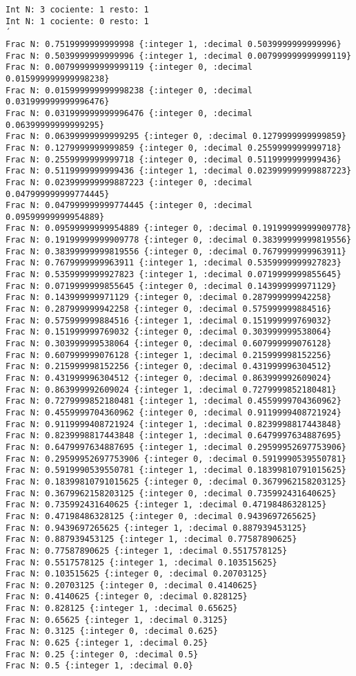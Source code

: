 \documentclass[stu, 12pt, letterpaper, donotrepeattitle, floatsintext, natbib]{apa7}
\begin{document}
\begin{verbatim}
Int N: 3 cociente: 1 resto: 1
Int N: 1 cociente: 0 resto: 1
´
Frac N: 0.7519999999999998 {:integer 1, :decimal 0.5039999999999996}
Frac N: 0.5039999999999996 {:integer 1, :decimal 0.007999999999999119}
Frac N: 0.007999999999999119 {:integer 0, :decimal 0.015999999999998238}
Frac N: 0.015999999999998238 {:integer 0, :decimal 0.031999999999996476}
Frac N: 0.031999999999996476 {:integer 0, :decimal 0.06399999999999295}
Frac N: 0.06399999999999295 {:integer 0, :decimal 0.1279999999999859}
Frac N: 0.1279999999999859 {:integer 0, :decimal 0.2559999999999718}
Frac N: 0.2559999999999718 {:integer 0, :decimal 0.5119999999999436}
Frac N: 0.5119999999999436 {:integer 1, :decimal 0.023999999999887223}
Frac N: 0.023999999999887223 {:integer 0, :decimal 0.047999999999774445}
Frac N: 0.047999999999774445 {:integer 0, :decimal 0.09599999999954889}
Frac N: 0.09599999999954889 {:integer 0, :decimal 0.19199999999909778}
Frac N: 0.19199999999909778 {:integer 0, :decimal 0.38399999999819556}
Frac N: 0.38399999999819556 {:integer 0, :decimal 0.7679999999963911}
Frac N: 0.7679999999963911 {:integer 1, :decimal 0.5359999999927823}
Frac N: 0.5359999999927823 {:integer 1, :decimal 0.0719999999855645}
Frac N: 0.0719999999855645 {:integer 0, :decimal 0.143999999971129}
Frac N: 0.143999999971129 {:integer 0, :decimal 0.287999999942258}
Frac N: 0.287999999942258 {:integer 0, :decimal 0.575999999884516}
Frac N: 0.575999999884516 {:integer 1, :decimal 0.151999999769032}
Frac N: 0.151999999769032 {:integer 0, :decimal 0.303999999538064}
Frac N: 0.303999999538064 {:integer 0, :decimal 0.607999999076128}
Frac N: 0.607999999076128 {:integer 1, :decimal 0.215999998152256}
Frac N: 0.215999998152256 {:integer 0, :decimal 0.431999996304512}
Frac N: 0.431999996304512 {:integer 0, :decimal 0.863999992609024}
Frac N: 0.863999992609024 {:integer 1, :decimal 0.7279999852180481}
Frac N: 0.7279999852180481 {:integer 1, :decimal 0.4559999704360962}
Frac N: 0.4559999704360962 {:integer 0, :decimal 0.9119999408721924}
Frac N: 0.9119999408721924 {:integer 1, :decimal 0.8239998817443848}
Frac N: 0.8239998817443848 {:integer 1, :decimal 0.6479997634887695}
Frac N: 0.6479997634887695 {:integer 1, :decimal 0.29599952697753906}
Frac N: 0.29599952697753906 {:integer 0, :decimal 0.5919990539550781}
Frac N: 0.5919990539550781 {:integer 1, :decimal 0.18399810791015625}
Frac N: 0.18399810791015625 {:integer 0, :decimal 0.3679962158203125}
Frac N: 0.3679962158203125 {:integer 0, :decimal 0.735992431640625}
Frac N: 0.735992431640625 {:integer 1, :decimal 0.47198486328125}
Frac N: 0.47198486328125 {:integer 0, :decimal 0.9439697265625}
Frac N: 0.9439697265625 {:integer 1, :decimal 0.887939453125}
Frac N: 0.887939453125 {:integer 1, :decimal 0.77587890625}
Frac N: 0.77587890625 {:integer 1, :decimal 0.5517578125}
Frac N: 0.5517578125 {:integer 1, :decimal 0.103515625}
Frac N: 0.103515625 {:integer 0, :decimal 0.20703125}
Frac N: 0.20703125 {:integer 0, :decimal 0.4140625}
Frac N: 0.4140625 {:integer 0, :decimal 0.828125}
Frac N: 0.828125 {:integer 1, :decimal 0.65625}
Frac N: 0.65625 {:integer 1, :decimal 0.3125}
Frac N: 0.3125 {:integer 0, :decimal 0.625}
Frac N: 0.625 {:integer 1, :decimal 0.25}
Frac N: 0.25 {:integer 0, :decimal 0.5}
Frac N: 0.5 {:integer 1, :decimal 0.0}


\end{verbatim}
\end{document}
